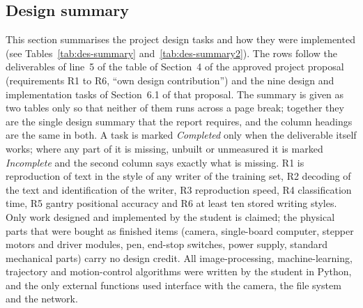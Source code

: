 \providecommand{\wht}{h_{\mathrm{t}}}

\subsection{Design summary}
\label{sec:summary}

This section summarises the project design tasks and how they were implemented (see Tables~\ref{tab:des-summary} and~\ref{tab:des-summary2}).
The rows follow the deliverables of line~5 of the table of Section~4 of the approved project proposal (requirements R1 to R6, ``own design contribution'') and the nine design and implementation tasks of Section~6.1 of that proposal.
The summary is given as two tables only so that neither of them runs across a page break; together they are the single design summary that the report requires, and the column headings are the same in both.
A task is marked \emph{Completed} only when the deliverable itself works; where any part of it is missing, unbuilt or unmeasured it is marked \emph{Incomplete} and the second column says exactly what is missing.
R1 is reproduction of text in the style of any writer of the training set, R2 decoding of the text and identification of the writer, R3 reproduction speed, R4 classification time, R5 gantry positional accuracy and R6 at least ten stored writing styles.
Only work designed and implemented by the student is claimed; the physical parts that were bought as finished items (camera, single-board computer, stepper motors and driver modules, pen, end-stop switches, power supply, standard mechanical parts) carry no design credit.
All image-processing, machine-learning, trajectory and motion-control algorithms were written by the student in Python, and the only external functions used interface with the camera, the file system and the network.

